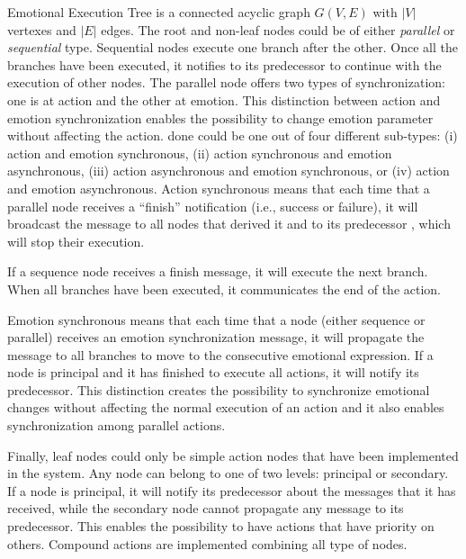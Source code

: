 Emotional Execution Tree is a connected acyclic graph $G(V,E)$ with $|V|$ vertexes and $|E|$ edges. The root and non-leaf nodes could be of either \textit{parallel} or \textit{sequential} type. Sequential nodes execute one branch after the other. Once all the branches have been executed, it notifies to its predecessor to continue with the execution of other nodes. The parallel node offers two types of synchronization: one is at action and the other at emotion. This distinction between action and emotion synchronization enables the possibility to change emotion parameter without affecting the action. %
done could be one out of four different sub-types: (i) action and emotion synchronous, (ii) action synchronous and emotion asynchronous, (iii) action asynchronous and emotion synchronous, or (iv) action and emotion asynchronous. 
Action synchronous means that each time that a parallel node receives a ``finish'' notification (i.e., success or failure), it will broadcast the message to all nodes that derived it and to its predecessor %
, which will stop their execution. 
 
If a sequence node receives a finish message, it will execute the next branch. When all branches have been executed, it communicates the end of the action. 
 
Emotion synchronous means that each time that a node (either sequence or parallel) receives an emotion synchronization message, it will propagate the message to all branches to move to the consecutive emotional expression. If a node is principal and it has finished to execute all actions, it will notify its predecessor. %
 This distinction creates the possibility to synchronize emotional changes without affecting the normal execution of an action and it also enables synchronization among parallel actions. 
 
Finally, leaf nodes could only be simple action nodes that have been implemented in the system. Any node can belong to one of two levels: principal or secondary. If a node is principal, it will notify its predecessor about the messages that it has received, while the secondary node cannot propagate any message to its predecessor. This enables the possibility to have actions that have priority on others. 
Compound actions are implemented combining all type of nodes. 
